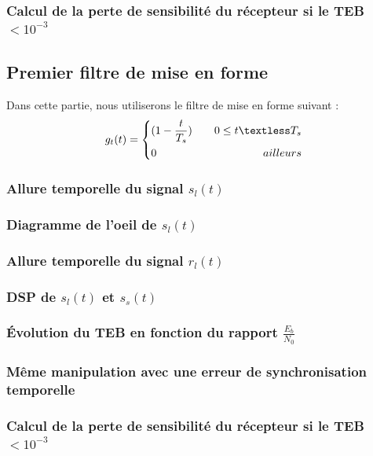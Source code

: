 \documentclass[11pt]{article}
\begin{document}
			
		\subsubsection{Calcul de la perte de sensibilité du récepteur si le TEB $< 10^{-3}$}
	
	\subsection{Premier filtre de mise en forme}
		Dans cette partie, nous utiliserons le filtre de mise en forme suivant :
		\begin{equation}
			g_t(t) = 
			\left\{
		    	\begin{aligned}
		    		&(1-\frac{t}{T_s}) & \,\,\,\,\,\, 0 \le t \textless T_s\\
		    		&0 & \,\,\,\,\,\, ailleurs
		      	\end{aligned}
		    \right.
		\end{equation}
		
		\subsubsection{Allure temporelle du signal $s_l(t)$}
		\subsubsection{Diagramme de l'oeil de $s_l(t)$}
		\subsubsection{Allure temporelle du signal $r_l(t)$}
		\subsubsection{DSP de $s_l(t)$ et $s_s(t)$}
		\subsubsection{Évolution du TEB en fonction du rapport $\frac{E_b}{N_0}$}
		\subsubsection{Même manipulation avec une erreur de synchronisation temporelle}
		\subsubsection{Calcul de la perte de sensibilité du récepteur si le TEB $< 10^{-3}$}
		
\end{document}
